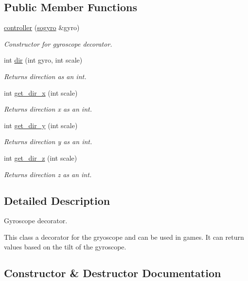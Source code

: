 \subsection*{Public Member Functions}
\begin{DoxyCompactItemize}
\item 
\hyperlink{classcontroller_afdfd96f893a363a81df69f9011772948}{controller} (\hyperlink{classsogyro}{sogyro} \&gyro)
\begin{DoxyCompactList}\small\item\em Constructor for gyroscope decorator. \end{DoxyCompactList}\item 
int \hyperlink{classcontroller_a08706a1d0b65e1e75cd136205861c3bb}{dir} (int gyro, int scale)
\begin{DoxyCompactList}\small\item\em Returns direction as an int. \end{DoxyCompactList}\item 
int \hyperlink{classcontroller_a0f32b7bba7ac0026bbdcde8de15eeb73}{get\+\_\+dir\+\_\+x} (int scale)
\begin{DoxyCompactList}\small\item\em Returns direction x as an int. \end{DoxyCompactList}\item 
int \hyperlink{classcontroller_a6947eb778084e6c5b74b993f0fda3eaf}{get\+\_\+dir\+\_\+y} (int scale)
\begin{DoxyCompactList}\small\item\em Returns direction y as an int. \end{DoxyCompactList}\item 
int \hyperlink{classcontroller_a26c377443455cda82579776db7e2b404}{get\+\_\+dir\+\_\+z} (int scale)
\begin{DoxyCompactList}\small\item\em Returns direction z as an int. \end{DoxyCompactList}\end{DoxyCompactItemize}


\subsection{Detailed Description}
Gyroscope decorator. 

This class a decorator for the gryoscope and can be used in games. It can return values based on the tilt of the gyroscope. 

\subsection{Constructor \& Destructor Documentation}
\mbox{\label{classcontroller_afdfd96f893a363a81df69f9011772948}} 
